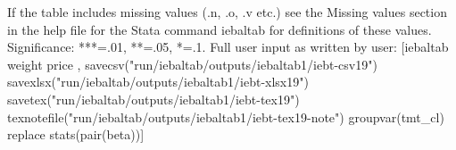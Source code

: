 If the table includes missing values (.n, .o, .v etc.) see the Missing values section in the help file for the Stata command iebaltab for definitions of these values. Significance: ***=.01, **=.05, *=.1. Full user input as written by user: [iebaltab weight price , savecsv("run/iebaltab/outputs/iebaltab1/iebt-csv19") savexlsx("run/iebaltab/outputs/iebaltab1/iebt-xlsx19") savetex("run/iebaltab/outputs/iebaltab1/iebt-tex19") texnotefile("run/iebaltab/outputs/iebaltab1/iebt-tex19-note") groupvar(tmt\_cl) replace stats(pair(beta))] 
